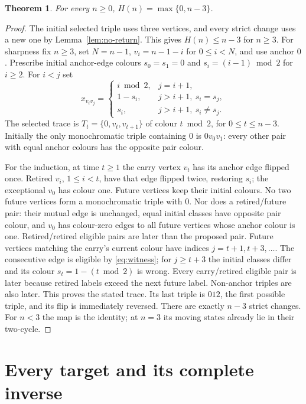 \documentclass[a4paper,10pt]{amsart}
\newtheorem{theorem}{Theorem}[section]
\theoremstyle{remark}
\begin{document}
\begin{theorem}\label{thm:time}
For every $n\ge0$, $H(n)=\max\{0,n-3\}$.
\end{theorem}
\begin{proof}
The initial selected triple uses three vertices, and every strict change
uses a new one by Lemma~\ref{lem:no-return}. This gives $H(n)\le n-3$
for $n\ge3$. For sharpness fix $n\ge3$, set $N=n-1$,
$v_i=n-1-i$ for $0\le i<N$, and use anchor $0$. Prescribe initial
anchor-edge colours $s_0=s_1=0$ and $s_i=(i-1)\bmod2$ for $i\ge2$.
For $i<j$ set
\begin{equation}\label{eq:witness}
x_{v_iv_j}=\begin{cases}
i\bmod2,&j=i+1,\\
1-s_i,&j>i+1,\ s_i=s_j,\\
s_i,&j>i+1,\ s_i\ne s_j.
\end{cases}
\end{equation}
The selected trace is
$T_t=\{0,v_t,v_{t+1}\}$ of colour $t\bmod2$, for $0\le t\le n-3$.
Initially the only monochromatic triple containing $0$ is $0v_0v_1$:
every other pair with equal anchor colours has the opposite pair colour.

For the induction, at time $t\ge1$ the carry vertex $v_t$ has its
anchor edge flipped once. Retired $v_i$, $1\le i<t$, have that edge
flipped twice, restoring $s_i$; the exceptional $v_0$ has colour one.
Future vertices keep their initial colours. No two future vertices form
a monochromatic triple with $0$. Nor does a retired/future pair: their
mutual edge is unchanged, equal initial classes have opposite pair colour,
and $v_0$ has colour-zero edges to all future vertices whose anchor colour
is one. Retired/retired eligible pairs are later than the proposed pair.
Future vertices matching the carry's current colour have indices
$j=t+1,t+3,\ldots$. The consecutive edge is eligible by
\eqref{eq:witness}; for $j\ge t+3$ the initial classes differ and its
colour $s_t=1-(t\bmod2)$ is wrong. Every carry/retired eligible pair is
later because retired labels exceed the next future label. Non-anchor
triples are also later. This proves the stated trace. Its last triple is
$012$, the first possible triple, and its flip is immediately reversed.
There are exactly $n-3$ strict changes. For $n<3$ the map is the identity;
at $n=3$ its moving states already lie in their two-cycle.
\end{proof}

\section{Every target and its complete inverse}
\end{document}
